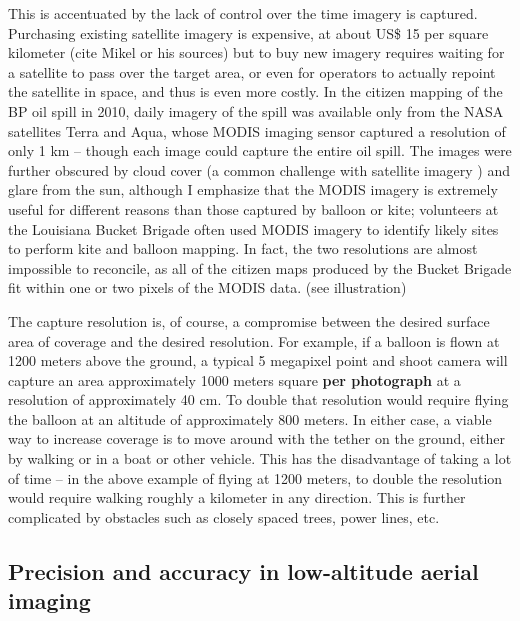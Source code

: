 \documentclass[11pt]{report}
\begin{document}
This is accentuated by the lack of control over the time imagery is captured. Purchasing existing satellite imagery is expensive, at about US\$ 15 per square kilometer (cite Mikel or his sources) but to buy new imagery requires waiting for a satellite to pass over the target area, or even for operators to actually repoint the satellite in space, and thus is even more costly. In the citizen mapping of the BP oil spill in 2010, daily imagery of the spill was available only from the NASA satellites Terra and Aqua, whose MODIS imaging sensor captured a resolution of only 1 km -- though each image could capture the entire oil spill. The images were further obscured by cloud cover (a common challenge with satellite imagery \cite{miyamoto2004use}) and glare from the sun, although I emphasize that the MODIS imagery is extremely useful for different reasons than those captured by balloon or kite; volunteers at the Louisiana Bucket Brigade often used MODIS imagery to identify likely sites to perform kite and balloon mapping. In fact, the two resolutions are almost impossible to reconcile, as all of the citizen maps produced by the Bucket Brigade fit within one or two pixels of the MODIS data. (see illustration)


The capture resolution is, of course, a compromise between the desired surface area of coverage and the desired resolution. For example, if a balloon is flown at 1200 meters above the ground, a typical 5 megapixel point and shoot camera will capture an area approximately 1000 meters square \textbf{per photograph} at a resolution of approximately 40 cm. To double that resolution would require flying the balloon at an altitude of approximately 800 meters. In either case, a viable way to increase coverage is to move around with the tether on the ground, either by walking or in a boat or other vehicle. This has the disadvantage of taking a lot of time -- in the above example of flying at 1200 meters, to double the resolution would require walking roughly a kilometer in any direction. This is further complicated by obstacles such as closely spaced trees, power lines, etc.

\subsection{Precision and accuracy in low-altitude aerial imaging}
\end{document}

